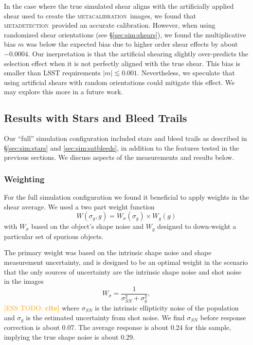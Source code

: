 \documentclass[twocolumn,twocolappendix,astrosym]{openjournal}
\newcommand{\esstodo}[1]{\textcolor{orange}{[ESS TODO: \bf #1]}}
\newcommand{\mcal}{\textsc{metacalibration}}
\newcommand{\mdet}{\textsc{metadetection}}
\begin{document}
In the case where the true simulated shear aligns with the artificially applied
shear used to create the \mcal\ images, we found that \mdet\ provided an
accurate calibration.  However, when using randomized shear orientations (see
\S \ref{sec:sim:shears}), we found the multiplicative bias $m$ was below the
expected bias due to higher order shear effects by about $-0.0004$.  Our
inerpretation is that the artificial shearing slightly over-predicts the
selection effect when it is not perfectly aligned with the true shear.  This
bias is smaller than LSST requirements $|m| \lesssim 0.001$.  Nevertheless, we
speculate that using artificial shears with random orientations could mitigate
this effect.  We may explore this more in a future work.

\subsection{Results with Stars and Bleed Trails} \label{sec:results:full}

Our ``full'' simulation configuration included stars and bleed trails as
described in \S \ref{sec:sim:stars} and \ref{sec:sim:satbleeds}, in addition to
the features tested in the previous sections.  We discuss aspects of the
measurements and results below.

\subsubsection{Weighting}

For the full simulation configuration we found it beneficial to apply weights
in the shear average.  We used a two part weight function
\begin{equation}
    W(\sigma_g, g) = W_\sigma (\sigma_g) \times W_g(g)
\end{equation}
with $W_\sigma$ based on the object's shape noise and $W_g$ designed to
down-weight a particular set of spurious objects.

The primary weight was based on the intrinsic shape noise and shape
measurement uncertainty, and is designed to be an optimal weight in the
scenario that the only sources of uncertainty are the intrinsic shape noise 
and shot noise in the images
\begin{equation}
    W_\sigma = \frac{1}{\sigma_{SN}^2 + \sigma_g^2},
\end{equation}
\esstodo{cite}
where $\sigma_{SN}$ is the intrinsic ellipticity noise of the population and
$\sigma_g$ is the estimated uncertainty from shot noise.  We find $\sigma_{SN}$
before response correction is about 0.07.  The average response is about 0.24
for this sample, implying the true shape noise is about 0.29.
\end{document}
